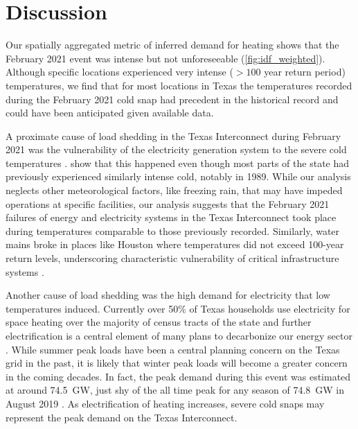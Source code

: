 \documentclass[12pt]{iopart}
\begin{document}
\section{Discussion}

Our spatially aggregated metric of inferred demand for heating shows that the February 2021 event was intense but not unforeseeable (\cref{fig:idf_weighted}).
Although specific locations experienced very intense ($>100$ year return period) temperatures, we find that for most locations in Texas the temperatures recorded during the February 2021 cold snap had precedent in the historical record and could have been anticipated given available data.

A proximate cause of load shedding in the Texas Interconnect during February 2021 was the vulnerability of the electricity generation system to the severe cold temperatures \cite{everhart_iea:2021}.
 show that this happened even though most parts of the state had previously experienced similarly intense cold, notably in 1989.
While our analysis neglects other meteorological factors, like freezing rain, that may have impeded operations at specific facilities, our analysis suggests that the February 2021 failures of energy and electricity systems in the Texas Interconnect took place during temperatures comparable to those previously recorded.
Similarly, water mains broke in places like Houston where temperatures did not exceed 100-year return levels, underscoring characteristic vulnerability of critical infrastructure systems \cite{chester_reliable:2020}.

Another cause of load shedding was the high demand for electricity that low temperatures induced.
Currently over 50\% of Texas households use electricity for space heating over the majority of census tracts of the state \cite{waite_heating:2020} and further electrification is a central element of many plans to decarbonize our energy sector \cite{williams_decarbonization:2012,davis:2018,white_txresidential:2019}.
While summer peak loads have been a central planning concern on the Texas grid in the past, it is likely that winter peak loads will become a greater concern in the coming decades.
In fact, the peak demand during this event was estimated at around \SI{74.5}{\giga\watt}, just shy of the all time peak for any season of \SI{74.8}{\giga\watt} in August 2019 \cite{everhart_iea:2021}.
As electrification of heating increases, severe cold snaps may represent the peak demand on the Texas Interconnect.
\end{document}
